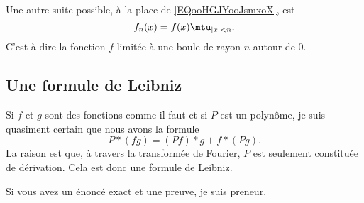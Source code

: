 \begin{remark}
	Une autre suite possible, à la place de \eqref{EQooHGJYooJsmxoX}, est
	\begin{equation}
		f_n(x)=f(x)\mtu_{| x |<n}.
	\end{equation}
	C'est-à-dire la fonction \( f\) limitée à une boule de rayon \( n\) autour de \( 0\).
\end{remark}

\subsection{Une formule de Leibniz}

\begin{probleme}        \label{PROPooBTXLooFhuYSs}
	Si \( f\) et \( g\) sont des fonctions comme il faut et si \( P\) est un polynôme, je suis quasiment certain que nous avons la formule
	\begin{equation}
		P*(fg)=(Pf)*g+f*(Pg).
	\end{equation}
	La raison est que, à travers la transformée de Fourier, \( P\) est seulement constituée de dérivation. Cela est donc une formule de Leibniz.

	Si vous avez un énoncé exact et une preuve, je suis preneur.
\end{probleme}
